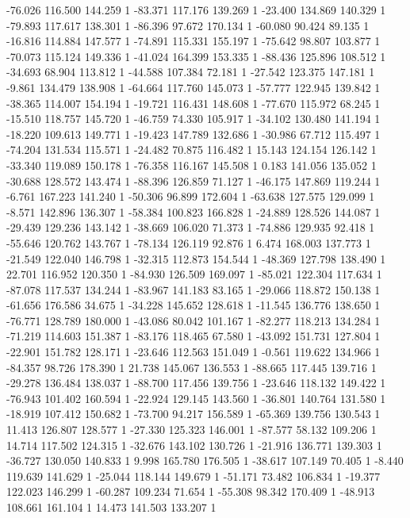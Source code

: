 	-76.026 116.500 144.259 1
	-83.371 117.176 139.269 1
	-23.400 134.869 140.329 1
	-79.893 117.617 138.301 1
	-86.396 97.672 170.134 1
	-60.080 90.424 89.135 1
	-16.816 114.884 147.577 1
	-74.891 115.331 155.197 1
	-75.642 98.807 103.877 1
	-70.073 115.124 149.336 1
	-41.024 164.399 153.335 1
	-88.436 125.896 108.512 1
	-34.693 68.904 113.812 1
	-44.588 107.384 72.181 1
	-27.542 123.375 147.181 1
	-9.861 134.479 138.908 1
	-64.664 117.760 145.073 1
	-57.777 122.945 139.842 1
	-38.365 114.007 154.194 1
	-19.721 116.431 148.608 1
	-77.670 115.972 68.245 1
	-15.510 118.757 145.720 1
	-46.759 74.330 105.917 1
	-34.102 130.480 141.194 1
	-18.220 109.613 149.771 1
	-19.423 147.789 132.686 1
	-30.986 67.712 115.497 1
	-74.204 131.534 115.571 1
	-24.482 70.875 116.482 1
	15.143 124.154 126.142 1
	-33.340 119.089 150.178 1
	-76.358 116.167 145.508 1
	0.183 141.056 135.052 1
	-30.688 128.572 143.474 1
	-88.396 126.859 71.127 1
	-46.175 147.869 119.244 1
	-6.761 167.223 141.240 1
	-50.306 96.899 172.604 1
	-63.638 127.575 129.099 1
	-8.571 142.896 136.307 1
	-58.384 100.823 166.828 1
	-24.889 128.526 144.087 1
	-29.439 129.236 143.142 1
	-38.669 106.020 71.373 1
	-74.886 129.935 92.418 1
	-55.646 120.762 143.767 1
	-78.134 126.119 92.876 1
	6.474 168.003 137.773 1
	-21.549 122.040 146.798 1
	-32.315 112.873 154.544 1
	-48.369 127.798 138.490 1
	22.701 116.952 120.350 1
	-84.930 126.509 169.097 1
	-85.021 122.304 117.634 1
	-87.078 117.537 134.244 1
	-83.967 141.183 83.165 1
	-29.066 118.872 150.138 1
	-61.656 176.586 34.675 1
	-34.228 145.652 128.618 1
	-11.545 136.776 138.650 1
	-76.771 128.789 180.000 1
	-43.086 80.042 101.167 1
	-82.277 118.213 134.284 1
	-71.219 114.603 151.387 1
	-83.176 118.465 67.580 1
	-43.092 151.731 127.804 1
	-22.901 151.782 128.171 1
	-23.646 112.563 151.049 1
	-0.561 119.622 134.966 1
	-84.357 98.726 178.390 1
	21.738 145.067 136.553 1
	-88.665 117.445 139.716 1
	-29.278 136.484 138.037 1
	-88.700 117.456 139.756 1
	-23.646 118.132 149.422 1
	-76.943 101.402 160.594 1
	-22.924 129.145 143.560 1
	-36.801 140.764 131.580 1
	-18.919 107.412 150.682 1
	-73.700 94.217 156.589 1
	-65.369 139.756 130.543 1
	11.413 126.807 128.577 1
	-27.330 125.323 146.001 1
	-87.577 58.132 109.206 1
	14.714 117.502 124.315 1
	-32.676 143.102 130.726 1
	-21.916 136.771 139.303 1
	-36.727 130.050 140.833 1
	9.998 165.780 176.505 1
	-38.617 107.149 70.405 1
	-8.440 119.639 141.629 1
	-25.044 118.144 149.679 1
	-51.171 73.482 106.834 1
	-19.377 122.023 146.299 1
	-60.287 109.234 71.654 1
	-55.308 98.342 170.409 1
	-48.913 108.661 161.104 1
	14.473 141.503 133.207 1
